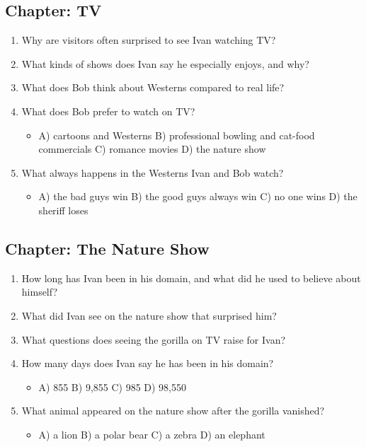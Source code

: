 \documentclass[11pt]{article}
\begin{document}
\subsection*{Chapter: TV}
\begin{enumerate}
  \item Why are visitors often surprised to see Ivan watching TV?
  \vspace{0.5in}
  \item What kinds of shows does Ivan say he especially enjoys, and why?
  \vspace{0.5in}
  \item What does Bob think about Westerns compared to real life?
  \vspace{0.5in}
  \item What does Bob prefer to watch on TV?
  \begin{itemize}\setlength\itemsep{0pt}
    \item[] A) cartoons and Westerns \quad B) professional bowling and cat-food commercials \quad C) romance movies \quad D) the nature show
  \end{itemize}
  \item What always happens in the Westerns Ivan and Bob watch?
  \begin{itemize}\setlength\itemsep{0pt}
    \item[] A) the bad guys win \quad B) the good guys always win \quad C) no one wins \quad D) the sheriff loses
  \end{itemize}
\end{enumerate}

\subsection*{Chapter: The Nature Show}
\begin{enumerate}
  \item How long has Ivan been in his domain, and what did he used to believe about himself?
  \vspace{0.5in}
  \item What did Ivan see on the nature show that surprised him?
  \vspace{0.5in}
  \item What questions does seeing the gorilla on TV raise for Ivan?
  \vspace{0.5in}
  \item How many days does Ivan say he has been in his domain?
  \begin{itemize}\setlength\itemsep{0pt}
    \item[] A) 855 \quad B) 9,855 \quad C) 985 \quad D) 98,550
  \end{itemize}
  \item What animal appeared on the nature show after the gorilla vanished?
  \begin{itemize}\setlength\itemsep{0pt}
    \item[] A) a lion \quad B) a polar bear \quad C) a zebra \quad D) an elephant
  \end{itemize}
\end{enumerate}
\end{document}
